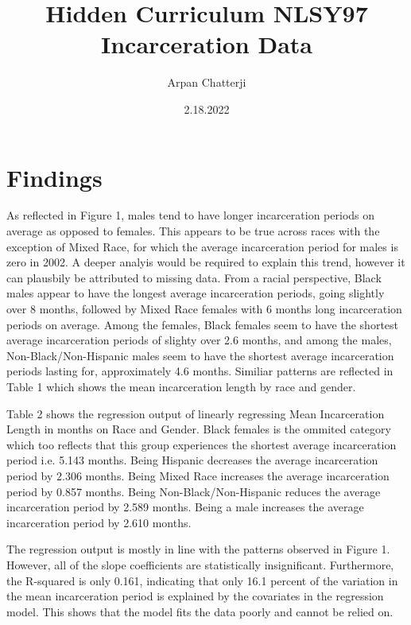 \documentclass{article}
\author{Arpan Chatterji}
\title{Hidden Curriculum NLSY97 Incarceration Data}
\date{2.18.2022}
\begin{document}
\maketitle

\section{Findings}

As reflected in Figure 1, males tend to have longer incarceration periods on average as opposed to females. This appears to be true across races with the exception of Mixed Race, for which the average incarceration period for males is zero in 2002. A deeper analyis would be required to explain this trend, however it can plausbily be attributed to missing data. From a racial perspective, Black males appear to have the longest average incarceration periods, going slightly over 8 months, followed by Mixed Race females with 6 months long incarceration periods on average. Among the females, Black females seem to have the shortest average incarceration periods of slighty over 2.6 months, and among the males, Non-Black/Non-Hispanic males seem to have the shortest average incarceration periods lasting for, approximately 4.6 months. Similiar patterns are reflected in Table 1 which shows the mean incarceration length by race and gender.

Table 2 shows the regression output of linearly regressing Mean Incarceration Length in months on Race and Gender. Black females is the ommited category which too reflects that this group experiences the shortest average incarceration period i.e. 5.143 months. Being Hispanic decreases the average incarceration period by 2.306 months. Being Mixed Race increases the average incarceration period by 0.857 months. Being Non-Black/Non-Hispanic reduces the average incarceration period by 2.589 months. Being a male increases the average incarceration period by 2.610 months.

The regression output is mostly in line with the patterns observed in Figure 1. However, all of the slope coefficients are statistically insignificant. Furthermore, the R-squared is only 0.161, indicating that only 16.1 percent of the variation in the mean incarceration period is explained by the covariates in the regression model. This shows that the model fits the data poorly and cannot be relied on.
\end{document}

